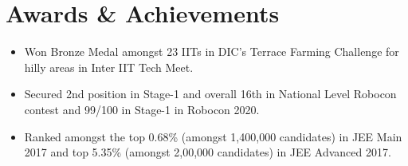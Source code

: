 \documentclass[a4paper,10pt]{article}
\newcommand{\customHeading}[1]{
    \section{\texorpdfstring{#1 \hrulefill}{}}
}
\begin{document}
\customHeading{Awards \& Achievements}
\begin{minipage}[t]{\linewidth}
    \begin{itemize}[nosep,after=\strut, leftmargin=1em, itemsep=3pt]
        \item Won Bronze Medal amongst 23 IITs in DIC’s Terrace Farming Challenge for hilly areas in Inter IIT Tech Meet.
        \item Secured 2nd position in Stage-1 and overall 16th in National Level Robocon contest and 99/100 in Stage-1 in Robocon 2020.
        \item  Ranked amongst the top 0.68\% (amongst 1,400,000 candidates) in JEE Main 2017 and top 5.35\% (amongst 2,00,000 candidates) in JEE Advanced 2017.
    \end{itemize}
\end{minipage}





\vfill
{}
\end{document}
